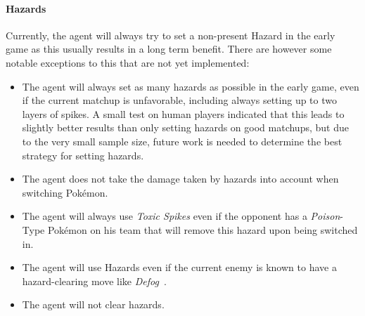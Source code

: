 \paragraph{Hazards}
Currently, the agent will always try to set a non-present Hazard in the early game as this usually 
results in a long term benefit. There are however some notable exceptions to this that 
are not yet implemented:
\begin{itemize}
  \item The agent will always set as many hazards as possible in the early game, even if the current matchup 
  is unfavorable, including always setting up to two layers of spikes. A small test on human players indicated
  that this leads to slightly better results than only setting hazards on good matchups, but due to the very
  small sample size, future work is needed to determine the best strategy for setting hazards.
  \item The agent does not take the damage taken by hazards into account when switching Pokémon. 
  \item The agent will always use \textit{Toxic Spikes} even if the opponent has a \textit{Poison}-Type
  Pokémon on his team that will remove this hazard upon being switched in.
  \item The agent will use Hazards even if the current enemy is known to have a hazard-clearing move like
  \textit{Defog}~\autocite{Bulbapedia:Defog}.
  \item The agent will not clear hazards.
\end{itemize}

